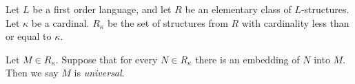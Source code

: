 \documentclass[12pt]{article}
\begin{document}
Let $L$ be a first order language, and let $R$ be an elementary class of $L$-structures. 
Let $\kappa$ be a cardinal. $R_{\kappa}$ be the set of structures from $R$ with cardinality less than or equal to $\kappa$.

\medskip

Let $M \in R_{\kappa}$. 
Suppose that for every $N \in R_{\kappa}$ there is an embedding of $N$ into $M$. 
Then we say $M$ is {\em universal}.
\end{document}
